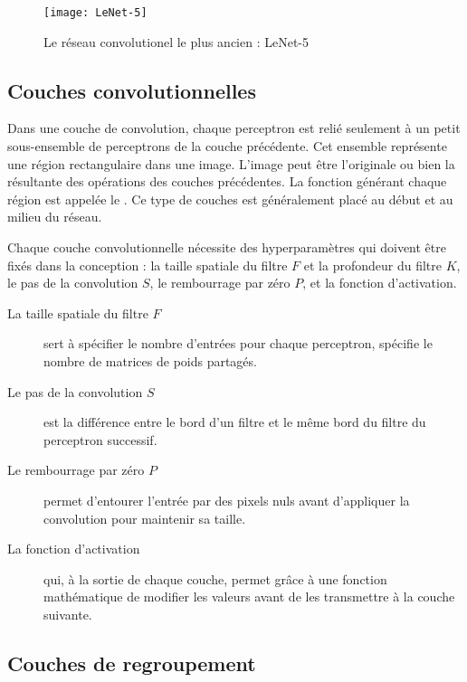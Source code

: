 \begin{figure}[H]
\begin{center}
\texttt{[image: LeNet-5]}
\caption{Le réseau convolutionel le plus ancien : LeNet-5}{\cite{lecun1998gradient}}
\end{center}
\end{figure}

\subsection{Couches convolutionnelles}

Dans une couche de convolution, chaque perceptron est relié seulement à un petit
sous-ensemble de perceptrons de la couche précédente. Cet ensemble représente
une région rectangulaire dans une image. L'image peut être l'originale ou
bien la résultante des opérations des couches précédentes. La fonction générant
chaque région est appelée le . Ce type de couches est généralement
placé au début et au milieu du réseau.

Chaque couche convolutionnelle nécessite des hyperparamètres qui doivent
être fixés dans la conception : la taille spatiale du filtre $F$ et la
profondeur du filtre $K$, le pas de la convolution $S$, le rembourrage par zéro
$P$, et la fonction d'activation.

\begin{description}
  \item[La taille spatiale du filtre $F$] sert à
  spécifier le nombre d'entrées pour chaque perceptron,
   spécifie
  le nombre de matrices de poids partagés.
  \item[Le pas de la convolution $S$] est la différence entre le bord d'un
  filtre et le même bord du filtre du perceptron successif.
  \item[Le rembourrage par zéro $P$] permet d'entourer
  l'entrée par des pixels nuls avant d'appliquer la convolution pour maintenir
  sa taille.
  \item[La fonction d'activation] qui, à la sortie de chaque couche, permet grâce
  à une fonction mathématique de modifier les valeurs avant de les transmettre à la
  couche suivante.
\end{description}

\subsection{Couches de regroupement}

